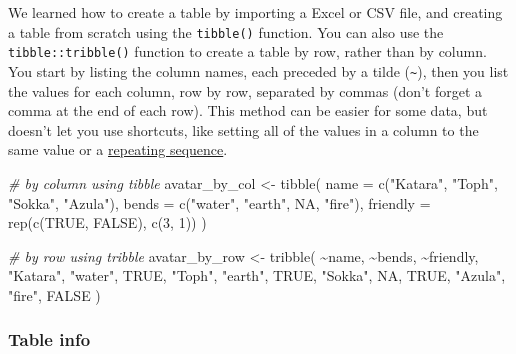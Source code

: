 \documentclass[
  oneside]{book}
\newenvironment{Shaded}{\begin{snugshade}}{\end{snugshade}}
\newcommand{\AttributeTok}[1]{\textcolor[rgb]{0.77,0.63,0.00}{#1}}
\newcommand{\CommentTok}[1]{\textcolor[rgb]{0.56,0.35,0.01}{\textit{#1}}}
\newcommand{\ConstantTok}[1]{\textcolor[rgb]{0.00,0.00,0.00}{#1}}
\newcommand{\DecValTok}[1]{\textcolor[rgb]{0.00,0.00,0.81}{#1}}
\newcommand{\FunctionTok}[1]{\textcolor[rgb]{0.00,0.00,0.00}{#1}}
\newcommand{\NormalTok}[1]{#1}
\newcommand{\OtherTok}[1]{\textcolor[rgb]{0.56,0.35,0.01}{#1}}
\newcommand{\SpecialCharTok}[1]{\textcolor[rgb]{0.00,0.00,0.00}{#1}}
\newcommand{\StringTok}[1]{\textcolor[rgb]{0.31,0.60,0.02}{#1}}
\begin{document}
We learned how to create a table by importing a Excel or CSV file, and creating a table from scratch using the \texttt{tibble()} function. You can also use the \texttt{tibble::tribble()} function to create a table by row, rather than by column. You start by listing the column names, each preceded by a tilde (\texttt{\textasciitilde{}}), then you list the values for each column, row by row, separated by commas (don't forget a comma at the end of each row). This method can be easier for some data, but doesn't let you use shortcuts, like setting all of the values in a column to the same value or a \protect\hyperlink{rep_seq}{repeating sequence}.

\begin{Shaded}
\begin{Highlighting}[]
\CommentTok{\# by column using tibble}
\NormalTok{avatar\_by\_col }\OtherTok{\textless{}{-}} \FunctionTok{tibble}\NormalTok{(}
  \AttributeTok{name =} \FunctionTok{c}\NormalTok{(}\StringTok{"Katara"}\NormalTok{, }\StringTok{"Toph"}\NormalTok{, }\StringTok{"Sokka"}\NormalTok{, }\StringTok{"Azula"}\NormalTok{),}
  \AttributeTok{bends =} \FunctionTok{c}\NormalTok{(}\StringTok{"water"}\NormalTok{, }\StringTok{"earth"}\NormalTok{, }\ConstantTok{NA}\NormalTok{, }\StringTok{"fire"}\NormalTok{),}
  \AttributeTok{friendly =} \FunctionTok{rep}\NormalTok{(}\FunctionTok{c}\NormalTok{(}\ConstantTok{TRUE}\NormalTok{, }\ConstantTok{FALSE}\NormalTok{), }\FunctionTok{c}\NormalTok{(}\DecValTok{3}\NormalTok{, }\DecValTok{1}\NormalTok{))}
\NormalTok{)}

\CommentTok{\# by row using tribble}
\NormalTok{avatar\_by\_row }\OtherTok{\textless{}{-}} \FunctionTok{tribble}\NormalTok{(}
  \SpecialCharTok{\textasciitilde{}}\NormalTok{name,    }\SpecialCharTok{\textasciitilde{}}\NormalTok{bends, }\SpecialCharTok{\textasciitilde{}}\NormalTok{friendly,}
  \StringTok{"Katara"}\NormalTok{, }\StringTok{"water"}\NormalTok{,       }\ConstantTok{TRUE}\NormalTok{,}
  \StringTok{"Toph"}\NormalTok{,   }\StringTok{"earth"}\NormalTok{,       }\ConstantTok{TRUE}\NormalTok{,}
  \StringTok{"Sokka"}\NormalTok{,  }\ConstantTok{NA}\NormalTok{,            }\ConstantTok{TRUE}\NormalTok{,}
  \StringTok{"Azula"}\NormalTok{,  }\StringTok{"fire"}\NormalTok{,        }\ConstantTok{FALSE}
\NormalTok{)}
\end{Highlighting}
\end{Shaded}

\hypertarget{table-info}{%
\subsubsection{Table info}\label{table-info}}
\end{document}
